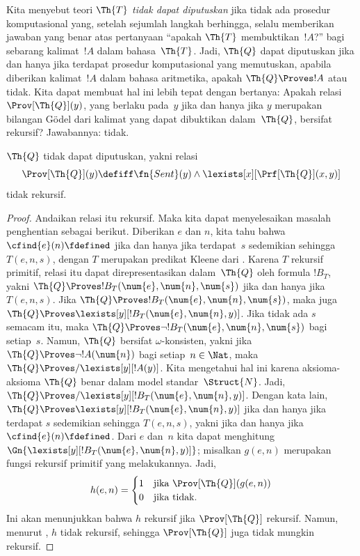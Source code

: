 \documentclass[../../../include/open-logic-section]{subfiles}
\begin{document}

Kita menyebut teori $\Th{T}$ \emph{tidak dapat diputuskan} jika tidak ada
prosedur komputasional yang, setelah sejumlah langkah berhingga, selalu
memberikan jawaban yang benar atas pertanyaan ``apakah $\Th{T}$
membuktikan~$!A$?'' bagi sebarang kalimat~$!A$ dalam bahasa~$\Th{T}$. Jadi,
$\Th{Q}$ dapat diputuskan jika dan hanya jika terdapat prosedur komputasional
yang memutuskan, apabila diberikan kalimat~$!A$ dalam bahasa aritmetika,
apakah $\Th{Q} \Proves !A$ atau tidak. Kita dapat membuat hal ini lebih tepat
dengan bertanya: Apakah relasi~$\Prov[\Th{Q}](y)$, yang berlaku pada~$y$ jika
dan hanya jika $y$ merupakan bilangan G\"odel dari kalimat yang dapat
dibuktikan dalam~$\Th{Q}$, bersifat rekursif? Jawabannya: tidak.

\begin{thm}
$\Th{Q}$ tidak dapat diputuskan, yakni relasi
\[
\Prov[\Th{Q}](y) \defiff \fn{Sent}(y) \land
\lexists[x][\Prf[\Th{Q}](x, y)]
\]
tidak rekursif.
\end{thm}

\begin{proof}
Andaikan relasi itu rekursif. Maka kita dapat menyelesaikan masalah
penghentian sebagai berikut. Diberikan $e$ dan $n$, kita tahu bahwa
$\cfind{e}(n) \fdefined$ jika dan hanya jika terdapat~$s$ sedemikian sehingga
$T(e, n, s)$, dengan $T$ merupakan predikat Kleene dari
. Karena $T$ rekursif primitif, relasi itu
dapat direpresentasikan dalam~$\Th{Q}$ oleh formula $!B_T$, yakni
$\Th{Q} \Proves !B_T(\num{e}, \num{n}, \num{s})$ jika dan hanya jika
$T(e, n, s)$. Jika
$\Th{Q} \Proves !B_T(\num{e}, \num{n}, \num{s})$, maka juga
$\Th{Q} \Proves \lexists[y][!B_T(\num{e}, \num{n}, y)]$. Jika tidak ada
$s$ semacam itu, maka $\Th{Q} \Proves
\lnot !B_T(\num{e}, \num{n}, \num{s})$ bagi setiap~$s$. Namun, $\Th{Q}$
bersifat $\omega$-konsisten, yakni jika
$\Th{Q} \Proves \lnot !A(\num{n})$ bagi setiap~$n \in \Nat$, maka
$\Th{Q} \Proves/ \lexists[y][!A(y)]$. Kita mengetahui hal ini karena
aksioma-aksioma $\Th{Q}$ benar dalam model standar~$\Struct{N}$. Jadi,
$\Th{Q} \Proves/ \lexists[y][!B_T(\num{e}, \num{n}, y)]$. Dengan kata lain,
$\Th{Q} \Proves \lexists[y][!B_T(\num{e}, \num{n}, y)]$ jika dan hanya jika
terdapat $s$ sedemikian sehingga $T(e, n, s)$, yakni jika dan hanya jika
$\cfind{e}(n) \fdefined$. Dari $e$ dan~$n$ kita dapat menghitung
$\Gn{\lexists[y][!B_T(\num{e}, \num{n}, y)]}$; misalkan $g(e, n)$ merupakan
fungsi rekursif primitif yang melakukannya. Jadi,
\[
h(e, n) =
\begin{cases}
1 & \text{jika $\Prov[\Th{Q}](g(e, n))$}\\
0 & \text{jika tidak}.
\end{cases}
\]
Ini akan menunjukkan bahwa $h$ rekursif jika $\Prov[\Th{Q}]$ rekursif.
Namun, menurut , $h$ tidak rekursif,
sehingga $\Prov[\Th{Q}]$ juga tidak mungkin rekursif.
\end{proof}
\end{document}
